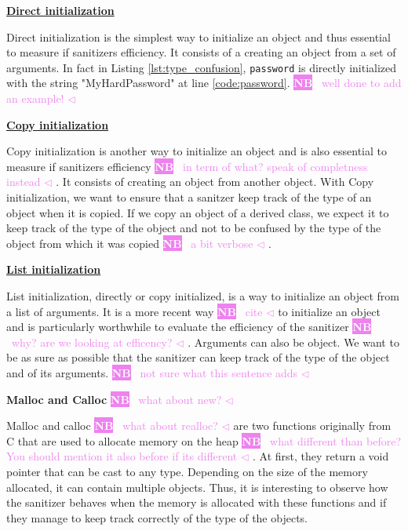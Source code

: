 \documentclass[a4paper,11pt,oneside]{report}
\newcommand{\todobox}[3]{%
       \colorbox{#1}{\textcolor{white}{\sffamily\bfseries\scriptsize #2}}%
       ~\textcolor{#1}{#3} %
       \textcolor{#1}{$\triangleleft$}%
}
\newcommand{\nb}[1]{\todobox{violet}{NB}{#1}}
\begin{document}
\textbf{\href{https://en.cppreference.com/w/cpp/language/direct_initialization}{Direct
initialization}}

\noindent{}Direct initialization is the simplest way to initialize an object and
thus essential to measure if sanitizers efficiency. It consists of a creating an
object from a set of arguments.  In fact in Listing
\autoref{lst:type_confusion}, \texttt{password} is directly initialized with the
string "MyHardPassword" at line \ref{code:password}. \nb{well done to add an example!}

\textbf{\href{https://en.cppreference.com/w/cpp/language/copy_initialization}{Copy
initialization}}

\noindent{}Copy initialization is another way to initialize an object and is
also essential to measure if sanitizers efficiency\nb{in term of what? speak of completness instead}. It consists of creating an
object from another object. With Copy initialization, we want to ensure that a
sanitzer keep track of the type of an object when it is copied. If we copy an
object of a derived class, we expect it to keep track of the type of the object
and not to be confused by the type of the object from which it was copied\nb{a bit verbose}.

\textbf{\href{https://en.cppreference.com/w/cpp/language/list_initialization}{List
initialization}}

\noindent{}List initialization, directly or copy initialized, is a way to
initialize an object from a list of arguments.  It is a more recent way\nb{cite} to
initialize an object and is particularly worthwhile to evaluate the efficiency
of the sanitizer\nb{why? are we looking at efficency?}.  Arguments can also be object. We want to be as sure as
possible that the sanitizer can keep track of the type of the object and of its
arguments. \nb{not sure what this sentence adds}

\textbf{Malloc and Calloc} \nb{what about new?}

\noindent{}Malloc and calloc \nb{what about realloc?} are two functions originally from C that are used
to allocate memory on the heap\nb{what different than before? You should mention it also before if its different}. At first, they return a void pointer that can be
cast to any type. Depending on the size of the memory allocated, it can contain
multiple objects.  Thus, it is interesting to observe how the sanitizer behaves
when the memory is allocated with these functions and if they manage to keep
track correctly of the type of the objects.
\end{document}
